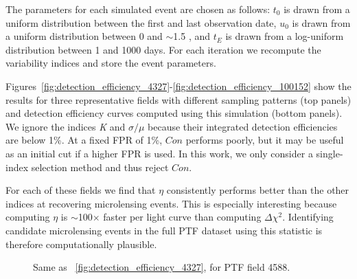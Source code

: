 \documentclass{emulateapj}
\begin{document}
The parameters for each simulated event are chosen as follows: $t_0$ is drawn from a uniform distribution between the first and last observation date, $u_0$ is drawn from a uniform distribution between 0 and $\sim$1.5 \citep[the impact parameter that causes a maximum deviation larger than $\sim$$5\sigma$ for a $R\sim17.5$ mag source; e.g.,][]{macho_detection_efficiency}, and $t_E$ is drawn from a log-uniform distribution between 1 and 1000 days. For each iteration we recompute the variability indices and store the event parameters. 

Figures~\ref{fig:detection_efficiency_4327}-\ref{fig:detection_efficiency_100152} show the results for three representative fields with different sampling patterns (top panels) and detection efficiency curves computed using this simulation (bottom panels). We ignore the indices \textit{K} and $\sigma/\mu$ because their integrated detection efficiencies are below 1\%. At a fixed FPR of 1\%, $Con$ performs poorly, but it may be useful as an initial cut if a higher FPR is used. In this work, we only consider a single-index selection method and thus reject $Con$. 

For each of these fields we find that $\eta$ consistently performs better than the other indices at recovering microlensing events. This is especially interesting because computing $\eta$ is $\sim$100$\times$ faster per light curve than computing $\Delta\chi^2$. Identifying candidate microlensing events in the full PTF dataset using this statistic is therefore computationally plausible.
	


\begin{figure}
\centering
	
\caption{Same as \figurename~\ref{fig:detection_efficiency_4327}, for PTF field 4588.}\label{fig:detection_efficiency_4588}
\end{figure}
\end{document}

